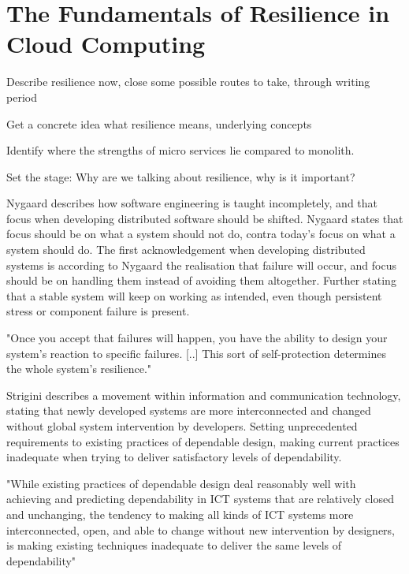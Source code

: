 \chapter{The Fundamentals of Resilience in Cloud Computing}
\label{ch:resillience}
Describe resilience now, close some possible routes to take, through writing period


Get a concrete idea what resilience means, underlying concepts


Identify where the strengths of micro services lie compared to monolith.


Set the stage: Why are we talking about resilience, why is it important?



Nygaard describes how software engineering is taught incompletely, and that focus when developing distributed software should be shifted. Nygaard states that focus should be on what a system should not do, contra today's focus on what a system should do. The first acknowledgement when developing distributed systems is according to Nygaard the realisation that failure will occur, and focus should be on handling them instead of avoiding them altogether. Further stating that a stable system will keep on working as intended, even though persistent stress or component failure is present.

\begin{quote_highlight}
"Once you accept that failures will happen, you have the ability to design your system's reaction to specific failures. [..] This sort of self-protection determines the whole system's resilience." \cite[p. 27]{nygard2007release}
\end{quote_highlight}

Strigini describes a movement within information and communication technology, stating that newly developed systems are more interconnected and changed without global system intervention by developers. Setting unprecedented requirements to existing practices of dependable design, making current practices inadequate when trying to deliver satisfactory levels of dependability.

\begin{quote_highlight}
"While existing practices of dependable design deal reasonably well with achieving and predicting dependability in ICT systems that are relatively closed and unchanging, the tendency to making all kinds of ICT systems more interconnected, open, and able to change without new intervention by designers, is making existing techniques inadequate to deliver the same levels of dependability"\cite[p. 5]{strigini2012fault}
\end{quote_highlight}

